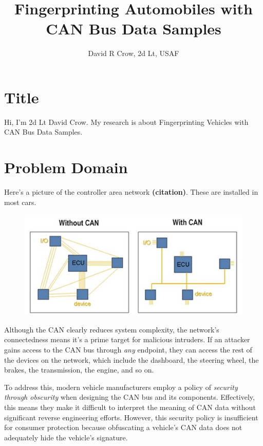 \documentclass[10pt]{article}
\title{Fingerprinting Automobiles with CAN Bus Data Samples}
\author{David R Crow, 2d Lt, USAF}
\newcommand{\newpar}{\medskip \noindent}
\begin{document}
\maketitle

\section{Title}

\newpar Hi, I’m 2d Lt David Crow. My research is about Fingerprinting Vehicles with CAN Bus Data Samples.

\section{Problem Domain}

\newpar Here's a picture of the controller area network \textbf{(citation)}. These are installed in most cars.

\begin{figure}
    \centerline{\includegraphics[scale=0.6]{can-wiring.jpg}}
\end{figure}

\newpar Although the CAN clearly reduces system complexity, the network's connectedness means it's a prime target for malicious intruders. If an attacker gains access to the CAN bus through \textit{any} endpoint, they can access the rest of the devices on the network, which include the dashboard, the steering wheel, the brakes, the transmission, the engine, and so on.

\newpar To address this, modern vehicle manufacturers employ a policy of \textit{security through obscurity} when designing the CAN bus and its components. Effectively, this means they make it difficult to interpret the meaning of CAN data without significant reverse engineering efforts. However, this security policy is insufficient for consumer protection because obfuscating a vehicle's CAN data does not adequately hide the vehicle's signature.
\end{document}
